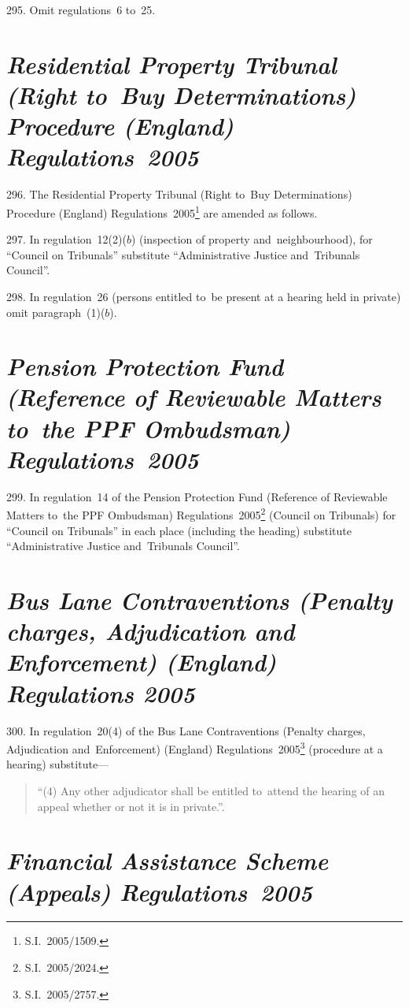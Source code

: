 \documentclass[12pt,a4paper]{article}
\begin{document}
\medskip

295.  Omit regulations~6 to~25.

\section*{\itshape Residential Property Tribunal (Right to~Buy Determinations) Procedure (England) Regulations~2005}

296.  The Residential Property Tribunal (Right to~Buy Determinations) Procedure (England) Regulations~2005\footnote{S.I.~2005/1509.} are amended as follows.

\medskip

297.  In regulation~12(2)($b$)  (inspection of property and~neighbourhood), for “Council on Tribunals” substitute “Administrative Justice and~Tribunals Council”.

\medskip

298.  In regulation~26 (persons entitled to~be present at a hearing held in private) omit paragraph~(1)($b$).

\section*{\itshape Pension Protection Fund (Reference of Reviewable Matters to~the PPF Ombudsman) Regulations~2005}

299.  In regulation~14 of the Pension Protection Fund (Reference of Reviewable Matters to~the PPF Ombudsman) Regulations~2005\footnote{S.I.~2005/2024.} (Council on Tribunals) for “Council on Tribunals” in each place (including the heading) substitute “Administrative Justice and~Tribunals Council”.

\section*{\itshape\sloppy{} Bus Lane Contraventions (Penalty charges, Adjudication and Enforcement) (England) Regulations 2005}

300.  In regulation~20(4) of the Bus Lane Contraventions (Penalty charges, Adjudication and~Enforcement) (England) Regulations~2005\footnote{S.I.~2005/2757.} (procedure at a hearing) substitute—
\begin{quotation}
“(4) Any other adjudicator shall be entitled to~attend the hearing of an appeal whether or not it is in private.”.
\end{quotation}

\section*{\itshape Financial Assistance Scheme (Appeals) Regulations~2005}
\end{document}
